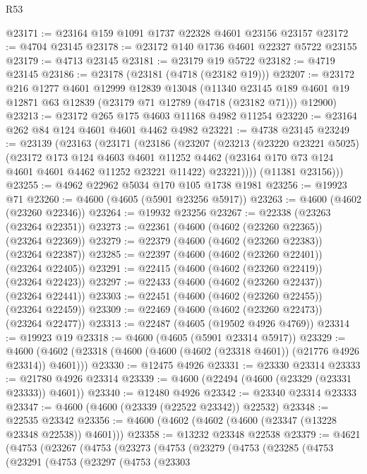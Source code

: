 \begin{lexlean}{R53}
\begin{coremodule}
@23171 := @23164 @159 @1091 @1737 @22328 @4601 @23156 @23157
@23172 := @4704 @23145
@23178 := @23172 @140 @1736 @4601 @22327 @5722 @23155
@23179 := @4713 @23145
@23181 := @23179 @19 @5722
@23182 := @4719 @23145
@23186 := @23178 (@23181 (@4718 (@23182 @19)))
@23207 := @23172
    @216
    @1277
    @4601
    @12999
    @12839
    @13048
    (@11340 @23145 @189 @4601 @19 @12871 @63 @12839 (@23179 @71 @12789 (@4718 (@23182 @71))) @12900)
@23213 := @23172 @265 @175 @4603 @11168 @4982 @11254
@23220 := @23164 @262 @84 @124 @4601 @4601 @4462 @4982
@23221 := @4738 @23145
@23249 := @23139
    (@23163
      (@23171
        (@23186
          (@23207
            (@23213
              (@23220 @23221 @5025)
              (@23172
                @173
                @124
                @4603
                @4601
                @11252
                @4462
                (@23164 @170 @73 @124 @4601 @4601 @4462 @11252 @23221 @11422)
                @23221))))
        (@11381 @23156)))
@23255 := @4962 @22962 @5034 @170 @105 @1738 @1981
@23256 := @19923 @71
@23260 := @4600 (@4605 (@5901 @23256 @5917))
@23263 := @4600 (@4602 (@23260 @22346))
@23264 := @19932 @23256
@23267 := @22338 (@23263 (@23264 @22351))
@23273 := @22361 (@4600 (@4602 (@23260 @22365)) (@23264 @22369))
@23279 := @22379 (@4600 (@4602 (@23260 @22383)) (@23264 @22387))
@23285 := @22397 (@4600 (@4602 (@23260 @22401)) (@23264 @22405))
@23291 := @22415 (@4600 (@4602 (@23260 @22419)) (@23264 @22423))
@23297 := @22433 (@4600 (@4602 (@23260 @22437)) (@23264 @22441))
@23303 := @22451 (@4600 (@4602 (@23260 @22455)) (@23264 @22459))
@23309 := @22469 (@4600 (@4602 (@23260 @22473)) (@23264 @22477))
@23313 := @22487 (@4605 (@19502 @4926 @4769))
@23314 := @19923 @19
@23318 := @4600 (@4605 (@5901 @23314 @5917))
@23329 := @4600 (@4602 (@23318 (@4600 (@4600 (@4602 (@23318 @4601)) (@21776 @4926 @23314)) @4601)))
@23330 := @12475 @4926
@23331 := @23330 @23314
@23333 := @21780 @4926 @23314
@23339 := @4600 (@22494 (@4600 (@23329 (@23331 @23333)) @4601))
@23340 := @12480 @4926
@23342 := @23340 @23314 @23333
@23347 := @4600 (@4600 (@23339 (@22522 @23342)) @22532)
@23348 := @22535 @23342
@23356 := @4600 (@4602 (@4602 (@4600 (@23347 (@13228 @23348 @22538)) @4601)))
@23358 := @13232 @23348 @22538
@23379 := @4621
    (@4753
      (@23267
        (@4753
          (@23273
            (@4753
              (@23279
                (@4753
                  (@23285
                    (@4753
                      (@23291
                        (@4753
                          (@23297
                            (@4753
                              (@23303

\end{coremodule}
\end{lexlean}
